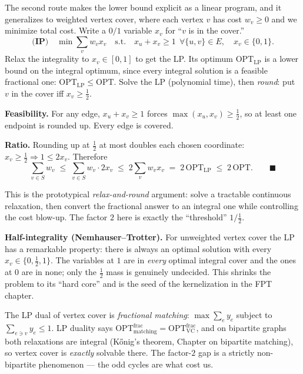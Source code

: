 The second route makes the lower bound explicit as a linear program, and it generalizes to weighted
vertex cover, where each vertex $v$ has cost $w_v\ge 0$ and we minimize total cost. Write a $0/1$
variable $x_v$ for ``$v$ is in the cover.''
\[
  \textbf{(IP)}\quad \min \sum_{v} w_v x_v
  \quad\text{s.t.}\quad x_u + x_v \ge 1\ \ \forall \{u,v\}\in E,\quad x_v\in\{0,1\}.
\]
Relax the integrality to $x_v\in[0,1]$ to get the LP. Its optimum $\mathrm{OPT}_{\mathrm{LP}}$ is a
lower bound on the integral optimum, since every integral solution is a feasible fractional one:
$\mathrm{OPT}_{\mathrm{LP}}\le\mathrm{OPT}$. Solve the LP (polynomial time), then \emph{round}: put
$v$ in the cover iff $x_v\ge \tfrac12$.

\begin{whybox}
\textbf{Feasibility.} For any edge, $x_u+x_v\ge 1$ forces $\max(x_u,x_v)\ge \tfrac12$, so at least
one endpoint is rounded up. Every edge is covered.

\textbf{Ratio.} Rounding up at $\tfrac12$ at most doubles each chosen coordinate:
$x_v\ge\tfrac12 \Rightarrow 1 \le 2x_v$. Therefore
\[
  \sum_{v\in S} w_v \;\le\; \sum_{v\in S} w_v\cdot 2x_v \;\le\; 2\sum_v w_v x_v
  \;=\; 2\,\mathrm{OPT}_{\mathrm{LP}} \;\le\; 2\,\mathrm{OPT}. \qquad\blacksquare
\]
\end{whybox}

This is the prototypical \emph{relax-and-round} argument: solve a tractable continuous relaxation,
then convert the fractional answer to an integral one while controlling the cost blow-up. The factor
$2$ here is exactly the ``threshold'' $1/\tfrac12$.

\begin{focusbox}
\textbf{Half-integrality (Nemhauser--Trotter).} For unweighted vertex cover the LP has a remarkable
property: there is always an optimal solution with every $x_v\in\{0,\tfrac12,1\}$. The variables at
$1$ are in \emph{every} optimal integral cover and the ones at $0$ are in none; only the $\tfrac12$
mass is genuinely undecided. This shrinks the problem to its ``hard core'' and is the seed of the
kernelization in the FPT chapter.
\end{focusbox}

\begin{connectionbox}
The LP dual of vertex cover is \emph{fractional matching}: $\max\sum_e y_e$ subject to
$\sum_{e\ni v} y_e\le 1$. LP duality says
$\mathrm{OPT}_{\mathrm{matching}}^{\mathrm{frac}}=\mathrm{OPT}_{\mathrm{VC}}^{\mathrm{frac}}$, and on
bipartite graphs both relaxations are integral (K\H{o}nig's theorem, Chapter on bipartite matching),
so vertex cover is \emph{exactly} solvable there. The factor-$2$ gap is a strictly non-bipartite
phenomenon --- the odd cycles are what cost us.
\end{connectionbox}

